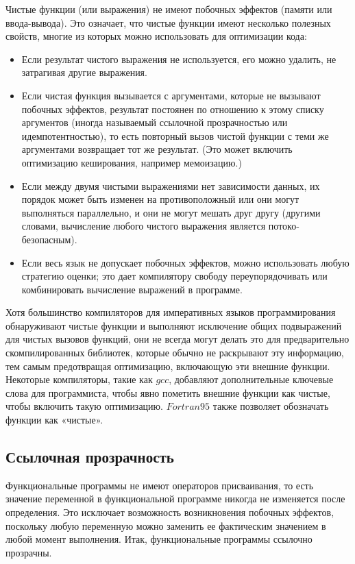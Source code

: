 Чистые функции (или выражения) не имеют побочных эффектов (памяти или ввода-вывода). Это означает, что чистые функции имеют несколько полезных свойств, многие из которых можно использовать для оптимизации кода: 

\begin{itemize}
    \item Если результат чистого выражения не используется, его можно удалить, не затрагивая другие выражения. 
    \item Если чистая функция вызывается с аргументами, которые не вызывают побочных эффектов, результат постоянен по отношению к этому списку аргументов (иногда называемый ссылочной прозрачностью или идемпотентностью), то есть повторный вызов чистой функции с теми же аргументами возвращает тот же результат. (Это может включить оптимизацию кеширования, например мемоизацию.) 
    \item Если между двумя чистыми выражениями нет зависимости данных, их порядок может быть изменен на противоположный или они могут выполняться параллельно, и они не могут мешать друг другу (другими словами, вычисление любого чистого выражения является потоко-безопасным). 
    \item Если весь язык не допускает побочных эффектов, можно использовать любую стратегию оценки; это дает компилятору свободу переупорядочивать или комбинировать вычисление выражений в программе. 
\end{itemize}

Хотя большинство компиляторов для императивных языков программирования обнаруживают чистые функции и выполняют исключение общих подвыражений для чистых вызовов функций, они не всегда могут делать это для предварительно скомпилированных библиотек, которые обычно не раскрывают эту информацию, тем самым предотвращая оптимизацию, включающую эти внешние функции. Некоторые компиляторы, такие как $gcc$, добавляют дополнительные ключевые слова для программиста, чтобы явно пометить внешние функции как чистые, чтобы включить такую оптимизацию. $Fortran 95$ также позволяет обозначать функции как «чистые». 

\subsection{Ссылочная прозрачность}\label{sec:ch1/sec3/subsec3}

Функциональные программы не имеют операторов присваивания, то есть значение переменной в функциональной программе никогда не изменяется после определения. Это исключает возможность возникновения побочных эффектов, поскольку любую переменную можно заменить ее фактическим значением в любой момент выполнения. Итак, функциональные программы ссылочно прозрачны. 

